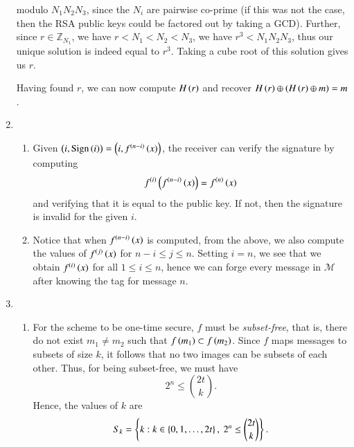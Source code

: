 \documentclass[journal,12pt,twocolumn]{IEEEtran}
\begin{document}
\begin{enumerate}
    modulo \(N_1N_2N_3\), since the \(N_i\) are pairwise co-prime (if this was
    not the case, then the RSA public keys could be factored out by taking a
    GCD). Further, since \(r \in \mathbb{Z}_{N_1}\), we have \(r < N_1 < N_2 <
    N_3\), we have \(r^3 < N_1N_2N_3\), thus our unique solution is indeed equal
    to \(r^3\). Taking a cube root of this solution gives us \(r\).

    Having found \(r\), we can now compute \(H\left(r\right)\) and recover \(H\left(r\right)
    \oplus \left(H\left(r\right) \oplus m\right) = m\).

    \item 
    \begin{enumerate}
        \item Given \(\left(i, \mathrm{Sign}\left(i\right)\right) = \left(i,
        f^{\left(n-i\right)}\left(x\right)\right)\), the receiver can verify the signature by
        computing
        \begin{equation}
            f^{\left(i\right)}\left(f^{\left(n-i\right)}\left(x\right)\right) = f^{\left(n\right)}\left(x\right)
            \label{eq:pubkey-recov}
        \end{equation}
        and verifying that it is equal to the public key. If not, then the
        signature is invalid for the given \(i\).

        \item Notice that when \(f^{\left(n-i\right)}\left(x\right)\) is computed, from the
        above, we also compute the values of \(f^{\left(j\right)}\left(x\right)\) for \(n -
        i \le j \le n\). Setting \(i = n\), we see that we obtain
        \(f^{\left(i\right)}\left(x\right)\) for all \(1 \le i \le n\), hence we can forge
        every message in \(\mathcal{M}\) after knowing the tag for message
        \(n\).
    \end{enumerate}

    \item 
    \begin{enumerate}
        \item For the scheme to be one-time secure, \(f\) must be
        \emph{subset-free}, that is, there do not exist \(m_1 \neq m_2\) such
        that \(f\left(m_1\right) \subset f\left(m_2\right)\). Since \(f\) maps messages to
        subsets of size \(k\), it follows that no two images can be subsets of
        each other. Thus, for being subset-free, we must have
        \begin{equation}
            2^n \le \binom{2t}{k}.
            \label{eq:subset-free-cond}
        \end{equation}
        Hence, the values of \(k\) are 
        \begin{equation}
            S_k = \left\{k: k \in \left\{0,1,\ldots,2t\right\},\ 2^n \le \binom{2t}{k}\right\}.
            \label{eq:Sk-ans}
        \end{equation}


\end{enumerate}
\end{enumerate}
\end{document}
